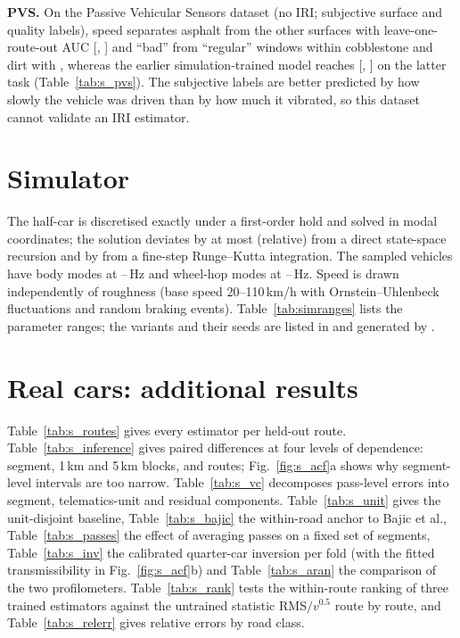 \documentclass[onecolumn,10pt]{IEEEtran}
\begin{document}
\textbf{PVS.}
On the Passive Vehicular Sensors dataset (no IRI; subjective surface and quality labels), speed separates asphalt from the other surfaces with leave-one-route-out AUC \pvsSurfSpeed{} [\pvsSurfSpeedLo, \pvsSurfSpeedHi] and ``bad'' from ``regular'' windows within cobblestone and dirt with \pvsBadSpeed, whereas the earlier simulation-trained model reaches \pvsBadModel{} [\pvsBadModelLo, \pvsBadModelHi] on the latter task (Table~\ref{tab:s_pvs}).
The subjective labels are better predicted by how slowly the vehicle was driven than by how much it vibrated, so this dataset cannot validate an IRI estimator.




\section{Simulator}
\label{sec:s_sim}
The half-car is discretised exactly under a first-order hold and solved in modal coordinates; the solution deviates by at most \simModalDev{} (relative) from a direct state-space recursion and by \simRkDev{} from a fine-step Runge--Kutta integration.
The sampled vehicles have body modes at \simBodyHzLo--\simBodyHzHi\,Hz and wheel-hop modes at \simHopHzLo--\simHopHzHi\,Hz.
Speed is drawn independently of roughness (base speed 20--110\,km/h with Ornstein--Uhlenbeck fluctuations and random braking events).
Table~\ref{tab:simranges} lists the parameter ranges; the variants and their seeds are listed in  and generated by .



\section{Real cars: additional results}
\label{sec:s_real}
Table~\ref{tab:s_routes} gives every estimator per held-out route.
Table~\ref{tab:s_inference} gives paired differences at four levels of dependence: segment, 1\,km and 5\,km blocks, and routes; Fig.~\ref{fig:s_acf}a shows why segment-level intervals are too narrow.
Table~\ref{tab:s_vc} decomposes pass-level errors into segment, telematics-unit and residual components.
Table~\ref{tab:s_unit} gives the unit-disjoint baseline, Table~\ref{tab:s_bajic} the within-road anchor to Bajic et al., Table~\ref{tab:s_passes} the effect of averaging passes on a fixed set of segments, Table~\ref{tab:s_inv} the calibrated quarter-car inversion per fold (with the fitted transmissibility in Fig.~\ref{fig:s_acf}b) and Table~\ref{tab:s_aran} the comparison of the two profilometers.
Table~\ref{tab:s_rank} tests the within-route ranking of three trained estimators against the untrained statistic RMS$/v^{0.5}$ route by route, and Table~\ref{tab:s_relerr} gives relative errors by road class.
\end{document}
